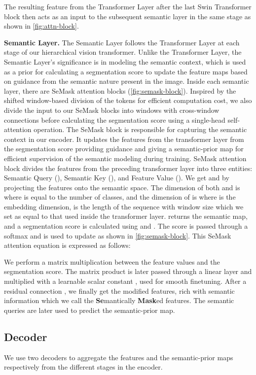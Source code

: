 \documentclass[10pt,twocolumn,letterpaper]{article}
\begin{document}
The resulting feature  from the Transformer Layer after the last Swin Transformer block then acts as an input to the subsequent semantic layer in the same stage as shown in \cref{fig:attn-block}.

\textbf{Semantic Layer.}  The Semantic Layer follows the Transformer Layer at each stage of our hierarchical vision transformer. Unlike the Transformer Layer, the Semantic Layer's significance is in modeling the semantic context, which is used as a prior for calculating a segmentation score to update the feature maps based on guidance from the semantic nature present in the image. 
Inside each semantic layer, there are  SeMask attention blocks (\cref{fig:semask-block}). Inspired by the shifted window-based division of the tokens for efficient computation cost, we also divide the input to our SeMask blocks into windows with cross-window connections before calculating the segmentation score using a single-head self-attention operation. The SeMask block is responsible for capturing the semantic context in our encoder. It updates the features from the transformer layer from the segmentation score  providing guidance and giving a semantic-prior map for efficient supervision of the semantic modeling during training. SeMask attention block divides the features  from the preceding transformer layer into three entities: Semantic Query (), Semantic Key (), and Feature Value (). We get  and  by projecting the features onto the semantic space. The dimension of both  and  is  where  is equal to the number of classes, and the dimension of  is  where  is the embedding dimension,  is the length of the sequence with  window size which we set as equal to that used inside the transformer layer.  returns the semantic map, and a segmentation score is calculated using  and . The score is passed through a softmax and is used to update  as shown in \cref{fig:semask-block}. This SeMask attention equation is expressed as follows:


We perform a matrix multiplication between the feature values and the segmentation score. The matrix product is later passed through a linear layer and multiplied with a learnable scalar constant , used for smooth finetuning. After a residual connection \cite{resnet}, we finally get the modified features, rich with semantic information which we call the \textbf{Se}mantically \textbf{Mask}ed features. The semantic queries  are later used to predict the semantic-prior map.

\subsection{Decoder}
\label{sec:decoder}
We use two decoders to aggregate the features and the semantic-prior maps respectively from the different stages in the encoder.
\end{document}
